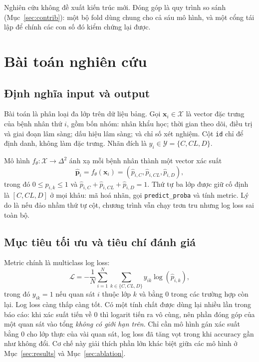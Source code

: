 \documentclass[12pt]{template/ai_conquer2026}
\begin{document}
Nghiên cứu không đề xuất kiến trúc mới. Đóng góp là quy trình so sánh
(Mục~\ref{sec:contrib}): một bộ fold dùng chung cho cả sáu mô hình, và một cổng
tái lập để chính các con số đó kiểm chứng lại được.

\section{Bài toán nghiên cứu}

\subsection{Định nghĩa input và output}

Bài toán là phân loại đa lớp trên dữ liệu bảng. Gọi $\mathbf{x}_i\in\mathcal{X}$
là vector đặc trưng của bệnh nhân thứ $i$, gồm bốn nhóm: nhân khẩu học; thời gian
theo dõi, điều trị và giai đoạn lâm sàng; dấu hiệu lâm sàng; và chỉ số xét nghiệm.
Cột \texttt{id} chỉ để định danh, không làm đặc trưng. Nhãn đích là
$y_i\in\mathcal{Y}=\{C,CL,D\}$.

Mô hình $f_{\theta}:\mathcal{X}\rightarrow\Delta^2$ ánh xạ mỗi bệnh nhân thành
một vector xác suất
\[
\hat{\mathbf p}_i=f_{\theta}(\mathbf{x}_i)
=(\hat p_{i,C},\hat p_{i,CL},\hat p_{i,D}),
\]
trong đó $0\leq\hat p_{i,k}\leq1$ và
$\hat p_{i,C}+\hat p_{i,CL}+\hat p_{i,D}=1$. Thứ tự ba lớp được giữ cố định là
$[C,CL,D]$ ở mọi khâu: mã hoá nhãn, gọi \texttt{predict\_proba} và tính metric.
Lý do là nếu đảo nhầm thứ tự cột, chương trình vẫn chạy trơn tru nhưng log loss
sai toàn bộ.

\subsection{Mục tiêu tối ưu và tiêu chí đánh giá}
\label{sec:metric}

Metric chính là multiclass log loss:
\[
\mathcal L=-\frac{1}{N}\sum_{i=1}^{N}
\sum_{k\in\{C,CL,D\}}y_{ik}\log(\hat p_{i,k}),
\]
trong đó $y_{ik}=1$ nếu quan sát $i$ thuộc lớp $k$ và bằng 0 trong các trường hợp
còn lại. Log loss càng thấp càng tốt. Có một tính chất được dùng lại nhiều lần
trong báo cáo: khi xác suất tiến về 0 thì logarit tiến ra vô cùng, nên phần đóng
góp của một quan sát vào tổng \emph{không có giới hạn trên}. Chỉ cần mô hình gán
xác suất bằng 0 cho lớp thực của vài quan sát, log loss đã tăng vọt trong khi
accuracy gần như không đổi. Cơ chế này giải thích phần lớn khác biệt giữa các mô
hình ở Mục~\ref{sec:results} và Mục~\ref{sec:ablation}.
\end{document}

